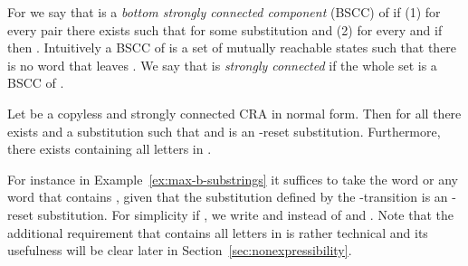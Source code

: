 For  we say that  is a \emph{bottom strongly connected component} (BSCC) of  if (1) for every pair  there exists  such that  for some substitution  and (2) for every  and  if  then .
Intuitively a BSCC  of  is a set of mutually reachable states such that there is no word that leaves . 
We say that  is \emph{strongly connected} if the whole set  is a BSCC of .


\begin{proposition}
	\label{prop:reset_register}
	Let  be a copyless and strongly connected CRA in normal form.
	Then for all  there exists  and a substitution  such that  and  is an -reset substitution.
	Furthermore, there exists  containing all letters in .
\end{proposition}
For instance in Example~\ref{ex:max-b-substrings} it suffices to take the word  or any word that contains , given that the substitution defined by the -transition is an -reset substitution. For simplicity if , we write  and  instead of  and . Note that the additional requirement that  contains all letters in  is rather technical and its usefulness will be clear later in Section~\ref{sec:nonexpressibility}.

